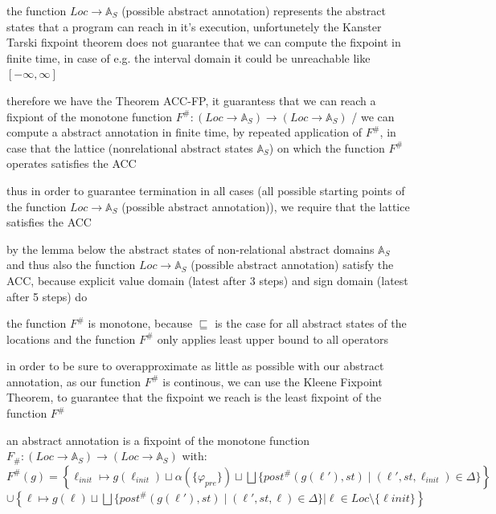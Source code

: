 \documentclass[a4paper]{article}
\begin{document}
\begin{minipage}[t]{0.16\linewidth}
\begin{betterlist}
{{\begin{betterlist}
\begin{betterlist}
						\item the function $Loc \rightarrow \mathbb{A}_S$ (possible abstract annotation) represents the abstract states that a program can reach in it's execution, unfortunetely the Kanster Tarski fixpoint theorem does not guarantee that we can compute the fixpoint in finite time, in case of e.g. the interval domain it could be unreachable like $[-\infty, \infty]$
						\item therefore we have the Theorem ACC-FP, it guarantess that we can reach a fixpiont of the monotone function $F^\#  : (Loc \rightarrow \mathbb{A}_S) \rightarrow (Loc \rightarrow \mathbb{A}_S)$ / we can compute a abstract annotation in finite time, by repeated application of $F^\#$, in case that the lattice (nonrelational abstract states $\mathbb{A}_S$) on which the function $F^\#$ operates satisfies the ACC
						\begin{betterlist}
							\item thus in order to guarantee termination in all cases (all possible starting points of the function $Loc \rightarrow \mathbb{A}_S$ (possible abstract annotation)), we require that the lattice satisfies the ACC
							\item by the lemma below the abstract states of non-relational abstract domains $\mathbb{A}_S$ and thus also the function $Loc \rightarrow \mathbb{A}_S$ (possible abstract annotation) satisfy the ACC, because explicit value domain (latest after 3 steps) and sign domain (latest after 5 steps) do
							\item the function $F^\#$ is monotone, because $\sqsubseteq$ is the case for all abstract states of the locations and the function $F^\#$ only applies least upper bound to all operators
						\end{betterlist}
						\item in order to be sure to overapproximate as little as possible with our abstract annotation, as our function $F^\#$ is continous, we can use the Kleene Fixpoint Theorem, to guarantee that the fixpoint we reach is the least fixpoint of the function $F^\#$%
						\item an abstract annotation is a fixpoint of the monotone function $F_\#  : (Loc \rightarrow \mathbb{A}_S) \rightarrow (Loc \rightarrow \mathbb{A}_S)$ with:\\$F^\# (g) = \left\{\ell_{init} \mapsto g(\ell_{init}) \sqcup \alpha(\{\varphi_{pre}\}) \sqcup \bigsqcup \{post^\#(g(\ell'), st) \mid (\ell', st, \ell_{init}) \in \Delta \}\right\}$\\$\cup  \left\{\ell \mapsto g(\ell) \sqcup  \bigsqcup \{post^\#(g(\ell'), st) \mid (\ell', st, \ell) \in \Delta \} | \ell \in Loc \setminus \{ \ell init\}\right\}$

\end{betterlist}
\end{betterlist}}}
\end{betterlist}
\end{minipage}
\end{document}
